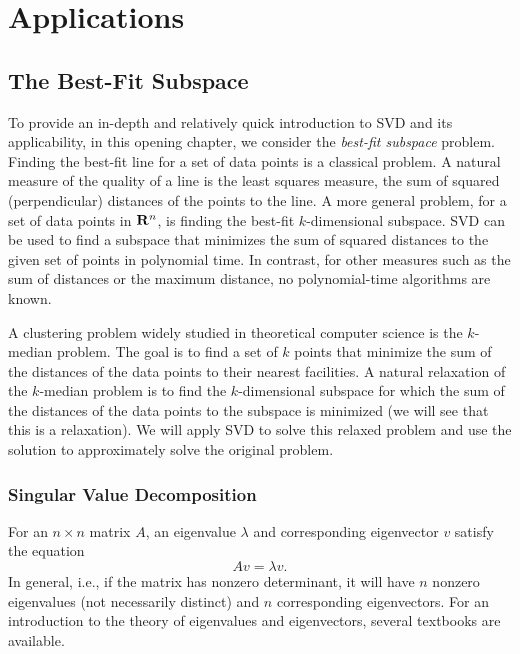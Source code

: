 \documentclass{book}
\numberwithin{exercise}{chapter}
\begin{document}
\part{Applications}
\chapter{The Best-Fit Subspace}

To provide an in-depth and relatively quick introduction to SVD and its applicability,
in this opening chapter, we consider the {\em best-fit subspace} problem.
Finding the best-fit line for a set of data points
is a classical problem.
A natural measure of the quality of a line is
the least squares measure, the sum of squared
(perpendicular) distances of the points to the line. A more general problem,
for a set of data points in ${\bf R}^n$, is finding the best-fit
$k$-dimensional subspace. SVD can be used to find a subspace that minimizes the
sum of squared distances to the given set of points in polynomial time.
In contrast, for other measures such as the sum of distances or the maximum
distance, no polynomial-time algorithms are known.

A clustering problem
widely studied in theoretical computer science is the $k$-median problem. The goal is to find a set of $k$ points
that minimize the sum of the distances of the data points to their nearest facilities.
A natural relaxation of the $k$-median problem is to find the
$k$-dimensional subspace for which the sum of the distances
of the data points to the subspace is minimized (we will see that this is a relaxation).
We will apply SVD to solve this relaxed problem and use the solution to approximately solve the original problem.


\section{Singular Value Decomposition}

For an $n \times n$ matrix $A$, an eigenvalue $\lambda$ and corresponding
eigenvector $v$ satisfy the equation
\[
Av = \lambda v.
\]
In general, i.e., if the matrix has nonzero determinant, it will have
$n$ nonzero eigenvalues (not necessarily distinct) and $n$ corresponding eigenvectors. For an introduction to the theory of eigenvalues and eigenvectors, several textbooks are available.
\end{document}
